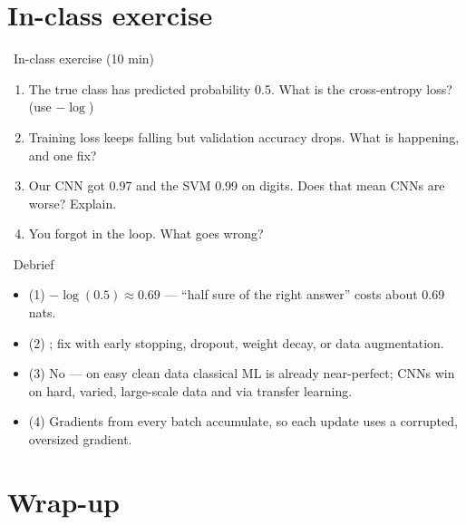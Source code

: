 \documentclass[10pt,aspectratio=169]{beamer}
\begin{document}
\section{In-class exercise}

\begin{frame}{\faPen~In-class exercise (10 min)}
  \begin{infobox}
  \end{infobox}
  \begin{enumerate}
    \item The true class has predicted probability 0.5. What is the cross-entropy loss? (use $-\log$)
    \item Training loss keeps falling but validation accuracy drops. What is happening, and one fix?
    \item Our CNN got 0.97 and the SVM 0.99 on digits. Does that mean CNNs are worse? Explain.
    \item You forgot  in the loop. What goes wrong?
  \end{enumerate}
\end{frame}

\begin{frame}{\faPen~Debrief}
  \begin{itemize}
    \item (1) $-\log(0.5) \approx 0.69$ --- ``half sure of the right answer'' costs about 0.69 nats.
    \item (2) ; fix with early stopping, dropout, weight decay, or data augmentation.
    \item (3) No --- on easy clean data classical ML is already near-perfect; CNNs win on hard, varied,
          large-scale data and via transfer learning.
    \item (4) Gradients from every batch accumulate, so each update uses a corrupted, oversized gradient.
  \end{itemize}
\end{frame}

\section{Wrap-up}
\end{document}
